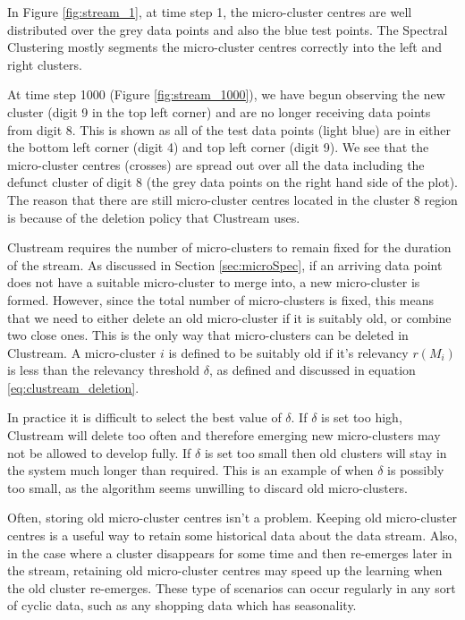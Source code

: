 In Figure \ref{fig:stream_1}, at time step 1, the micro-cluster centres are well distributed over the grey data points and also the blue test points. The Spectral Clustering mostly segments the micro-cluster centres correctly into the left and right clusters. 

At time step 1000 (Figure \ref{fig:stream_1000}), we have begun observing the new cluster (digit 9 in the top left corner) and are no longer receiving data points from digit 8. This is shown as all of the test data points (light blue) are in either the bottom left corner (digit 4) and top left corner (digit 9). We see that the micro-cluster centres (crosses) are spread out over all the data including the defunct cluster of digit 8 (the grey data points on the right hand side of the plot).  The reason that there are still micro-cluster centres located in the cluster 8 region is because of the deletion policy that Clustream uses.

Clustream requires the number of micro-clusters to remain fixed for the duration of the stream. As discussed in Section \ref{sec:microSpec}, if an arriving data point does not have a suitable micro-cluster to merge into, a new micro-cluster is formed. However, since the total number of micro-clusters is fixed, this means that we need to either delete an old micro-cluster if it is suitably old, or combine two close ones. This is the only way that micro-clusters can be deleted in Clustream.  A micro-cluster $i$ is defined to be suitably old if it's relevancy $r(M_i)$ is less than the relevancy threshold $\delta$, as defined and discussed in equation \eqref{eq:clustream_deletion}.

In practice it is difficult to select the best value of $\delta$. If $\delta$ is set too high, Clustream will delete too often and therefore emerging new micro-clusters may not be allowed to develop fully. If $\delta$ is set too small then old clusters will stay in the system much longer than required. This is an example of when $\delta$ is possibly too small, as the algorithm seems unwilling to discard old micro-clusters. %

Often, storing old micro-cluster centres  isn't a problem. Keeping old micro-cluster centres is a useful way to retain some historical data about the data stream. Also, in the case where a cluster disappears for some time and then re-emerges later in the stream, retaining old micro-cluster centres may speed up the learning when the old cluster re-emerges. These type of scenarios can occur regularly in any sort of cyclic data, such as any shopping data which has seasonality. 

